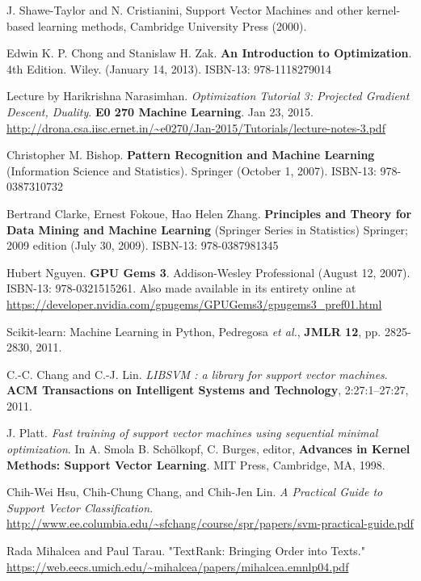 \documentclass[10pt]{amsart}
\begin{document}
\begin{thebibliography}{9}
J.  Shawe-Taylor  and  N.  Cristianini,  Support  Vector  Machines  and  other  kernel-based  learning  methods,
Cambridge University Press (2000).



Edwin K. P. Chong and Stanislaw H. Zak.  \textbf{An Introduction to Optimization}.  4th Edition.  Wiley.  (January 14, 2013).  ISBN-13: 978-1118279014
  
Lecture by Harikrishna Narasimhan.  \emph{Optimization Tutorial 3: Projected Gradient Descent, Duality}.  \textbf{E0 270 Machine Learning}.  Jan 23, 2015.  \url{http://drona.csa.iisc.ernet.in/~e0270/Jan-2015/Tutorials/lecture-notes-3.pdf}

Christopher M. Bishop.  \textbf{Pattern Recognition and Machine Learning} (Information Science and Statistics).  Springer (October 1, 2007).  ISBN-13: 978-0387310732


Bertrand Clarke, Ernest Fokoue, Hao Helen Zhang.   \textbf{Principles and Theory for Data Mining and Machine Learning} (Springer Series in Statistics)  Springer; 2009 edition (July 30, 2009).  ISBN-13: 978-0387981345
 

Hubert Nguyen. \textbf{GPU Gems 3}.  Addison-Wesley Professional (August 12, 2007).  ISBN-13: 978-0321515261.  Also made available in its entirety online at \url{https://developer.nvidia.com/gpugems/GPUGems3/gpugems3_pref01.html}

  Scikit-learn: Machine Learning in Python, Pedregosa \emph{et al.}, \textbf{JMLR 12}, pp. 2825-2830, 2011.

  C.-C. Chang and C.-J. Lin. \emph{LIBSVM : a library for support vector machines}. \textbf{ACM Transactions on Intelligent Systems and Technology}, 2:27:1--27:27, 2011. 

  J. Platt. \emph{Fast training of support vector machines using sequential minimal optimization}. In A. Smola B. Schölkopf, C. Burges, editor, \textbf{Advances in Kernel Methods: Support Vector Learning}. MIT Press, Cambridge, MA, 1998.

Chih-Wei Hsu, Chih-Chung Chang, and Chih-Jen Lin.  \emph{A Practical Guide to Support Vector Classification}.  \url{http://www.ee.columbia.edu/~sfchang/course/spr/papers/svm-practical-guide.pdf}

Rada Mihalcea and Paul Tarau.  "TextRank: Bringing Order into Texts."  
\url{https://web.eecs.umich.edu/~mihalcea/papers/mihalcea.emnlp04.pdf}  


\end{thebibliography}
\end{document}
